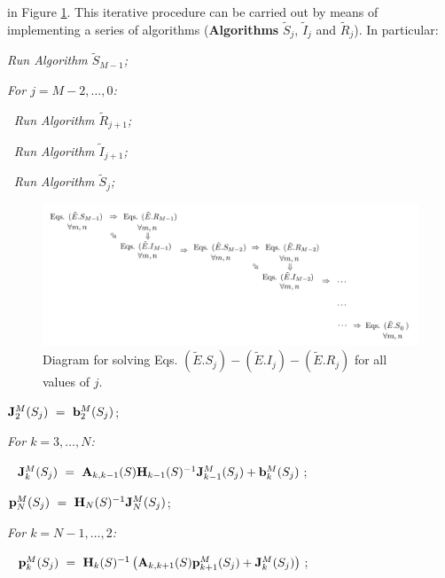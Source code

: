 \documentclass[preprint,12pt]{elsarticle}
\begin{document}
in Figure \ref{fig:diag}. This iterative procedure can be carried out by means of implementing a series of algorithms ({\bf Algorithms} ${\tilde S}_{j}$,
${\tilde I}_{j}$ and ${\tilde R}_{j}$). In particular:
\begin{description}
  \item \it Run Algorithm ${\tilde S}_{M-1}$;
  \item \it For $j=M-2,\dots,0$:
  \item $~$\hspace{0.5cm} \it Run Algorithm ${\tilde R}_{j+1}$;
  \item $~$\hspace{0.5cm} \it Run Algorithm ${\tilde I}_{j+1}$;
  \item $~$\hspace{0.5cm} \it Run Algorithm ${\tilde S}_{j}$;
\end{description}

\begin{figure}
\centering
\includegraphics[width=\textwidth]{FigureSolutionNew.jpg}
\caption{Diagram for solving Eqs. $({\tilde E}.S_j)-({\tilde E}.I_j)-({\tilde E}.R_j)$ for all values of $j$.}
\label{fig:diag}
\end{figure}

\vspace{0.5cm}
\par {}
\begin{description}
  \item ${\bf J}^M_2(S_j) ~=~ {\bf b}^M_2(S_j)$;
  \item \it For $k=3,\dots,N$:
  \item $~$\hspace{0.5cm} ${\bf J}^M_k(S_j) ~=~ {\bf A}_{k,k-1}(S){\bf H}_{k-1}(S)^{-1}{\bf J}^M_{k-1}(S_j)+{\bf b}^M_k(S_j)$;
  \item ${\bf p}^M_N(S_j) ~=~ {\bf H}_N(S)^{-1}{\bf J}^M_N(S_j)$;
  \item \it For $k=N-1,\dots,2$:
  \item $~$\hspace{0.5cm} ${\bf p}^M_k(S_j) ~=~ {\bf H}_k(S)^{-1}\left({\bf A}_{k,k+1}(S){\bf p}^M_{k+1}(S_j)+{\bf J}^M_k(S_j)\right)$;
\end{description}
\end{document}

